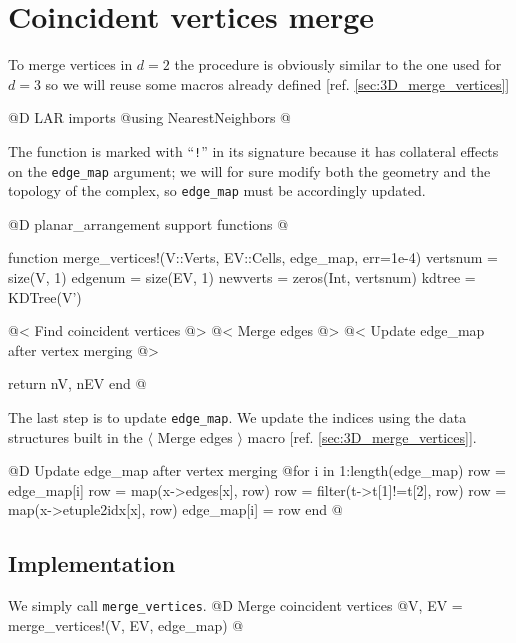 \section{Coincident vertices merge}
\label{sec:2D_merge_vertices}

To merge vertices in $d=2$ the procedure is obviously similar to the one 
used for $d=3$ so we will
reuse some macros already defined [ref. \ref{sec:3D_merge_vertices}]

@D LAR imports
@{using NearestNeighbors
@}

The function is marked with ``\texttt{!}'' in its signature 
because it has collateral effects
on the \texttt{edge\_map} argument; we will for sure modify both
the geometry and the topology of the complex, so \texttt{edge\_map}
must be accordingly updated.

@D planar\_arrangement support functions
@{function merge_vertices!(V::Verts, EV::Cells, edge_map, err=1e-4)
    vertsnum = size(V, 1)
    edgenum = size(EV, 1)
    newverts = zeros(Int, vertsnum)
    kdtree = KDTree(V')

    @< Find coincident vertices @>
    @< Merge edges @>
    @< Update edge\_map after vertex merging @>

    return nV, nEV
end
@}

The last step is to update \texttt{edge\_map}.
We update the indices using the data structures
built in the $\langle$ Merge edges $\rangle$ macro
[ref. \ref{sec:3D_merge_vertices}].

@D Update edge\_map after vertex merging
@{for i in 1:length(edge_map)
    row = edge_map[i]
    row = map(x->edges[x], row)
    row = filter(t->t[1]!=t[2], row)
    row = map(x->etuple2idx[x], row)
    edge_map[i] = row
end
@}


\subsection{Implementation}
We simply call \texttt{merge\_vertices}.
@D Merge coincident vertices
@{V, EV = merge_vertices!(V, EV, edge_map)
@}

